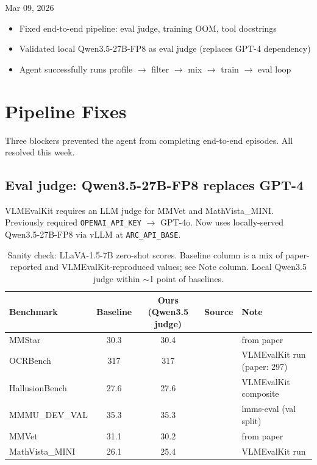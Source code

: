 \meetingheader
    {Mar 09, 2026}
    {}
    {}
    {\begin{itemize}
        \item Fixed end-to-end pipeline: eval judge, training OOM, tool docstrings
        \item Validated local Qwen3.5-27B-FP8 as eval judge (replaces GPT-4 dependency)
        \item Agent successfully runs profile $\to$ filter $\to$ mix $\to$ train $\to$ eval loop
    \end{itemize}}
    {}



\section{Pipeline Fixes}

Three blockers prevented the agent from completing end-to-end episodes. All resolved this week.

\subsection{Eval judge: Qwen3.5-27B-FP8 replaces GPT-4}

VLMEvalKit requires an LLM judge for MMVet and MathVista\_MINI.
Previously required \texttt{OPENAI\_API\_KEY} $\to$ GPT-4o.
Now uses locally-served Qwen3.5-27B-FP8 via vLLM at \texttt{ARC\_API\_BASE}.

\begin{table}[H]
\centering
\small
\caption{Sanity check: LLaVA-1.5-7B zero-shot scores. Baseline column is a mix of paper-reported and VLMEvalKit-reproduced values; see Note column. Local Qwen3.5 judge within $\sim$1 point of baselines.}
\label{tab:judge-sanity}
\begin{tabular}{lccll}
\toprule
\textbf{Benchmark} & \textbf{Baseline} & \textbf{Ours (Qwen3.5 judge)} & \textbf{Source} & \textbf{Note} \\
\midrule
MMStar & 30.3 & 30.4 & \cite{chen2024mmstar} & from paper \\
OCRBench & 317 & 317 & \cite{liu2023ocrbench} & VLMEvalKit run (paper: 297) \\
HallusionBench & 27.6 & 27.6 & \cite{guan2024hallusionbench} & VLMEvalKit composite \\
MMMU\_DEV\_VAL & 35.3 & 35.3 & \cite{yue2024mmmu} & lmms-eval (val split) \\
MMVet & 31.1 & 30.2 & \cite{yu2024mmvet} & from paper \\
MathVista\_MINI & 26.1 & 25.4 & \cite{lu2024mathvista} & VLMEvalKit run \\
\bottomrule
\end{tabular}
\end{table}

